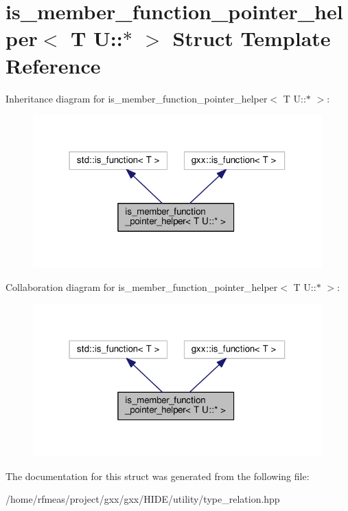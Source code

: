 \hypertarget{structis__member__function__pointer__helper_3_01T_01U_1_1_5_01_4}{}\section{is\+\_\+member\+\_\+function\+\_\+pointer\+\_\+helper$<$ T U\+:\+:$\ast$ $>$ Struct Template Reference}
\label{structis__member__function__pointer__helper_3_01T_01U_1_1_5_01_4}


Inheritance diagram for is\+\_\+member\+\_\+function\+\_\+pointer\+\_\+helper$<$ T U\+:\+:$\ast$ $>$\+:
\nopagebreak
\begin{figure}[H]
\begin{center}
\leavevmode
\includegraphics[width=316pt]{structis__member__function__pointer__helper_3_01T_01U_1_1_5_01_4__inherit__graph}
\end{center}
\end{figure}


Collaboration diagram for is\+\_\+member\+\_\+function\+\_\+pointer\+\_\+helper$<$ T U\+:\+:$\ast$ $>$\+:
\nopagebreak
\begin{figure}[H]
\begin{center}
\leavevmode
\includegraphics[width=316pt]{structis__member__function__pointer__helper_3_01T_01U_1_1_5_01_4__coll__graph}
\end{center}
\end{figure}


The documentation for this struct was generated from the following file\+:\begin{DoxyCompactItemize}
\item 
/home/rfmeas/project/gxx/gxx/\+H\+I\+D\+E/utility/type\+\_\+relation.\+hpp\end{DoxyCompactItemize}
